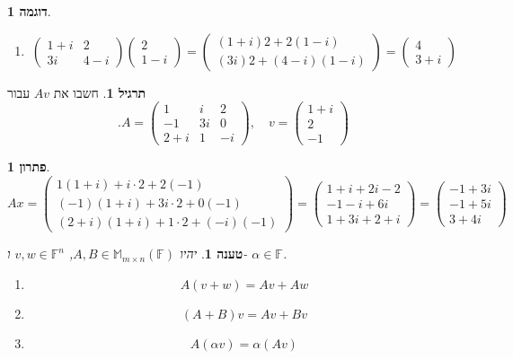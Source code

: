 \documentclass[12pt]{report}
\theoremstyle{plain}
\newtheorem{proposition}[theorem]{טענה}
\theoremstyle{definition}
\newtheorem{example}{דוגמה}[chapter]
\newtheorem{exercise}{תרגיל}[chapter]
\newtheorem*{solution}{פתרון}
\newcommand{\F}{\mathbb{F}}
\newcommand{\M}{\mathbb{M}}
\newcommand{\0}{\mathbf{0}}
\begin{document}
\begin{example}
\begin{enumerate}[label=\alph*.]
\item
$$
\begin{pmatrix}
1+i & 2 \\
3i & 4-i
\end{pmatrix}\begin{pmatrix}
2 \\
1-i
\end{pmatrix}=\begin{pmatrix}
(1+i)2 + 2(1-i) \\
(3i)2 + (4-i)(1-i)
\end{pmatrix}
=
\begin{pmatrix}
4 \\
3 + i
\end{pmatrix}
$$


\end{enumerate}
\end{example}

\begin{exercise}
חשבו את 
$Av$
עבור
$$
.A = \begin{pmatrix}
1 & i & 2 \\
-1 & 3i & 0 \\
2+i & 1 & -i
\end{pmatrix}, \quad 
v = \begin{pmatrix}
1+i \\
2 \\
-1
\end{pmatrix}
$$
\end{exercise}

\begin{solution}
$$
Ax=\begin{pmatrix}
1(1+i) + i\cdot 2 + 2(-1) \\
(-1)(1+i) + 3i\cdot2 + 0(-1) \\
(2+i)(1+i) + 1\cdot2 + (-i)(-1)
\end{pmatrix}
=
\begin{pmatrix}
1+i + 2i - 2 \\
-1 - i + 6i \\
1+3i+2+i
\end{pmatrix}
=
\begin{pmatrix}
-1 + 3i \\
-1 + 5i \\
3+4i
\end{pmatrix}
$$
\end{solution}

\begin{proposition}\label{prop:matrix-vector}
יהיו
$A,B\in\M_{m\times n}(\F)$,
$v,w\in\F^n$
ו-
$\alpha\in\F$.
\begin{enumerate}[label=\alph*.]
\item
$$
A(v+w)=Av+Aw
$$


\item 
$$
(A+B)v=Av+Bv
$$


\item 
$$
A(\alpha v)=\alpha(Av)
$$


\end{enumerate}
\end{proposition}
\end{document}

